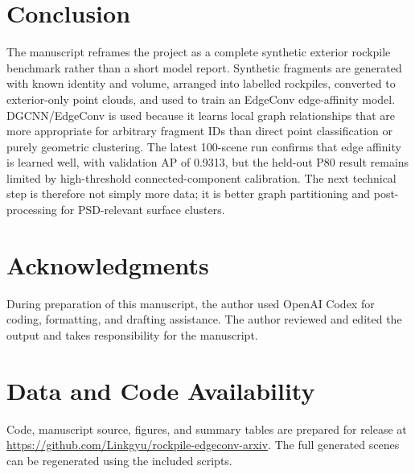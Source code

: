\documentclass[11pt]{article}
\begin{document}
\section{Conclusion}
The manuscript reframes the project as a complete synthetic exterior rockpile benchmark rather than a short model report. Synthetic fragments are generated with known identity and volume, arranged into labelled rockpiles, converted to exterior-only point clouds, and used to train an EdgeConv edge-affinity model. DGCNN/EdgeConv is used because it learns local graph relationships that are more appropriate for arbitrary fragment IDs than direct point classification or purely geometric clustering. The latest 100-scene run confirms that edge affinity is learned well, with validation AP of 0.9313, but the held-out P80 result remains limited by high-threshold connected-component calibration. The next technical step is therefore not simply more data; it is better graph partitioning and post-processing for PSD-relevant surface clusters.

\section*{Acknowledgments}
During preparation of this manuscript, the author used OpenAI Codex for coding, formatting, and drafting assistance. The author reviewed and edited the output and takes responsibility for the manuscript.

\section*{Data and Code Availability}
Code, manuscript source, figures, and summary tables are prepared for release at \url{https://github.com/Linkgyu/rockpile-edgeconv-arxiv}. The full generated scenes can be regenerated using the included scripts.
\end{document}
